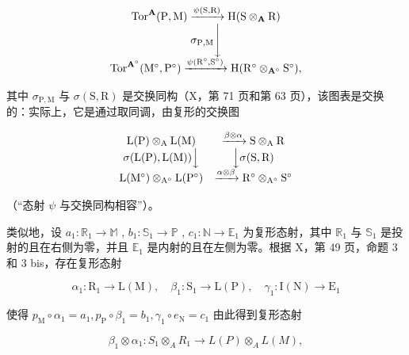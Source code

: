 \[
\begin{array}{c} \operatorname{Tor} ^ {\mathbf {A}} (\mathrm{P}, \mathrm{M}) \xrightarrow {\psi (\mathrm{S} , \mathrm{R})} \mathrm{H} (\mathrm{S} \otimes_ {\mathbf {A}} \mathrm{R}) \\ \sigma_ {\mathrm{P}, \mathrm{M}} \Biggl \downarrow \\ \operatorname{Tor} ^ {\mathbf {A} ^ {\circ}} (\mathrm{M} ^ {\circ}, \mathrm{P} ^ {\circ}) \xrightarrow {\psi (\mathrm{R} ^ {\circ} , \mathrm{S} ^ {\circ})} \mathrm{H} (\mathrm{R} ^ {\circ} \otimes_ {\mathbf {A} ^ {\circ}} \mathrm{S} ^ {\circ}), \end{array}
\]

其中 \(\sigma_{\mathrm{P,M}}\) 与 \(\sigma(\mathrm{S},\mathrm{R})\) 是交换同构（X，第 71 页和第 63 页），该图表是交换的：实际上，它是通过取同调，由复形的交换图

\[
\begin{array}{c c} \mathrm{L} (\mathrm{P}) \otimes_ {\mathrm{A}} \mathrm{L} (\mathrm{M}) & \xrightarrow {\beta \otimes \alpha} \mathrm{S} \otimes_ {\mathrm{A}} \mathrm{R} \\ \sigma (\mathrm{L} (\mathrm{P}), \mathrm{L} (\mathrm{M})) \Big \downarrow & \Big \downarrow \sigma (\mathrm{S}, \mathrm{R}) \\ \mathrm{L} (\mathrm{M} ^ {\circ}) \otimes_ {\mathrm{A} ^ {\circ}} \mathrm{L} (\mathrm{P} ^ {\circ}) & \xrightarrow {\alpha \otimes \beta} \mathrm{R} ^ {\circ} \otimes_ {\mathrm{A} ^ {\circ}} \mathrm{S} ^ {\circ} \end{array}
\]

（“态射 \(\psi\) 与交换同构相容”）。

类似地，设 \(a_{1}: \mathbb{R}_{1} \to \mathbb{M}\) , \(b_{1}: \mathbb{S}_{1} \to \mathbb{P}\) , \(c_{1}: \mathbb{N} \to \mathbb{E}_{1}\) 为复形态射，其中 \(\mathbb{R}_{1}\) 与 \(\mathbb{S}_{1}\) 是投射的且在右侧为零，并且 \(\mathbb{E}_{1}\) 是内射的且在左侧为零。根据 X，第 49 页，命题 3 和 3 bis，存在复形态射

\[
\alpha_ {1}: \mathrm{R} _ {1} \rightarrow \mathrm{L} (\mathrm{M}), \quad \beta_ {1}: \mathrm{S} _ {1} \rightarrow \mathrm{L} (\mathrm{P}), \quad \gamma_ {1}: \mathrm{I} (\mathrm{N}) \rightarrow \mathrm{E} _ {1}
\]

使得 \(p_{\mathrm{M}} \circ \alpha_{1} = a_{1}, p_{\mathrm{P}} \circ \beta_{1} = b_{1}, \gamma_{1} \circ e_{\mathrm{N}} = c_{1}\) 由此得到复形态射

\[
\beta_ {1} \otimes \alpha_ {1}: S _ {1} \otimes_ {A} R _ {1} \rightarrow L (P) \otimes_ {A} L (M),
\]

